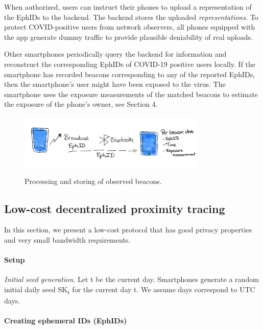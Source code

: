 \documentclass{article}
\begin{document}
When authorized, users can instruct their phones to upload a
representation of the EphIDs to the backend. The backend stores the
uploaded \emph{representations.} To protect COVID-positive users from
network observers, all phones equipped with the app generate dummy
traffic to provide plausible deniability of real uploads.

Other smartphones periodically query the backend for information and
reconstruct the corresponding EphIDs of COVID-19 positive users locally.
If the smartphone has recorded beacons corresponding to any of the
reported EphIDs, then the smartphone's user might have been exposed to
the virus. The smartphone uses the exposure measurements of the matched
beacons to estimate the exposure of the phone's owner, see Section 4.

\begin{figure}\centering
\includegraphics[width = 0.8\textwidth]{figs/storing_beacons.png}
\label{fig:storing_beacons}
\caption{Processing and storing of observed beacons.}
\end{figure}



\hypertarget{low-cost-decentralized-proximity-tracing}{%
\subsection{Low-cost decentralized proximity
tracing}\label{low-cost-decentralized-proximity-tracing}}

In this section, we present a low-cost protocol that has good privacy
properties and very small bandwidth requirements.

\hypertarget{setup}{%
\paragraph{Setup}\label{setup}}

\emph{Initial seed generation.} Let t be the current day. Smartphones
generate a random initial daily seed SK\textsubscript{t} for the current
day t. We assume days correspond to UTC days.

\hypertarget{creating-ephemeral-ids-ephids}{%
\paragraph{Creating ephemeral IDs
(EphIDs)}\label{creating-ephemeral-ids-ephids}}
\end{document}
